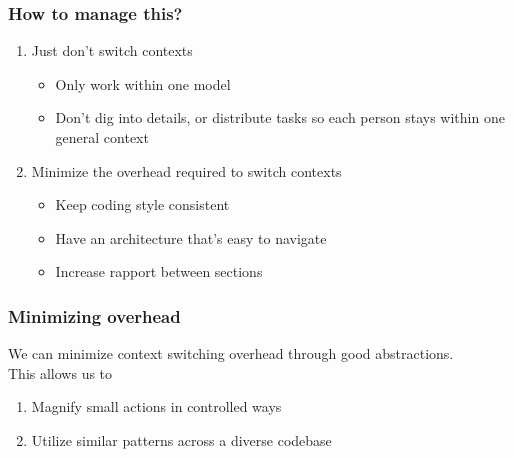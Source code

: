 \documentclass{beamer}
\begin{document}
\begin{frame}
\frametitle{How to manage this?}
  \begin{enumerate}
    \item Just don't switch contexts
      \begin{itemize}
        \item Only work within one model
        \item Don't dig into details, or distribute tasks so each person stays within one general context
      \end{itemize}
    \item Minimize the overhead required to switch contexts
      \begin{itemize}
        \item Keep coding style consistent
        \item Have an architecture that's easy to navigate
        \item Increase rapport between sections
      \end{itemize}
  \end{enumerate}
\end{frame}
%


\begin{frame}
\frametitle{Minimizing overhead}
  We can minimize context switching overhead through good abstractions. \\
  This allows us to
  \begin{enumerate}
    \item Magnify small actions in controlled ways
    \item Utilize similar patterns across a diverse codebase
  \end{enumerate}
\end{frame}
\end{document}
